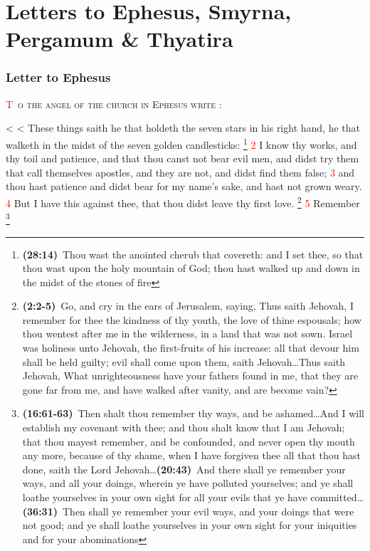 \documentclass[12pt,twoside]{memoir}
\makeatletter
\newcommand{\cbibleref}[3]{\textbf{\ibibleverse[textit]{#1}(#2)}\ {#3}}
\newcommand{\cbiblechvs}[3]{\textbf{\ibiblechvs[textit]{#1}(#2)}\ {#3}}
\newcommand{\cbiblefoot}[3]{\footnote{\cbibleref{#1}{#2}{#3}}}
\newcommand{\cbiblefoottriosb}[7]{\footnote{\cbibleref{#1}{#2}{#3}\ldots \cbiblechvs{#1}{#4}{#5}\ldots \cbiblechvs{#1}{#6}{#7}}}
\newcommand{\vnum}[1]{\textcolor{red}{\normalsize{#1}}}
\def\zz{%
\ifnum\prevgraf<\c@L@lines
\zzc\z@
\loop
\ifnum\zzc<\prevgraf
\advance\zzc\@ne
\afterassignment\zzda\count@\L@parshape\relax
\repeat
\parshape\L@parshape
\fi}
\def\zzda{\afterassignment\zzdb\dimen@}
\def\zzdb{\afterassignment\zzdef\dimen@}
\def\zzdef#1\relax{\edef\L@parshape{\the\numexpr\count@-1\relax\space #1}}
\makeatother
\begin{document}
\chapter{Letters to Ephesus, Smyrna, \newline Pergamum \& Thyatira}
\subsection*{Letter to Ephesus}
\lettrine[lines=3]{\textcolor{red}{T}}{\ o the angel of the church in Ephesus write} :

\zz These things saith he that holdeth the seven stars in his right hand, he that walketh in the midst of the seven golden candlesticks:%
	\cbiblefoot{Ezekiel}{28:14}{Thou wast the anointed cherub that covereth: and I set thee, so that thou wast upon the holy mountain of God; thou hast walked up and down in the midst of the stones of fire}
\vnum{2} I know thy works, and thy toil and patience, and that thou canst not bear evil men, and didst try them that call themselves apostles, and they are not, and didst find them false; %
\vnum{3} and thou hast patience and didst bear for my name’s sake, and hast not grown weary. %
\vnum{4} But I have this against thee, that thou didst leave thy first love.%
	\cbiblefoot{Jeremiah}{2:2-5}{Go, and cry in the ears of Jerusalem, saying, Thus saith Jehovah, I remember for thee the kindness of thy youth, the love of thine espousals; how thou wentest after me in the wilderness, in a land that was not sown. Israel was holiness unto Jehovah, the first-fruits of his increase: all that devour him shall be held guilty; evil shall come upon them, saith Jehovah\ldots Thus saith Jehovah, What unrighteousness have your fathers found in me, that they are gone far from me, and have walked after vanity, and are become vain?}
\vnum{5} Remember%
	\cbiblefoottriosb{Ezekiel}{16:61-63}{Then shalt thou remember thy ways, and be ashamed\ldots And I will establish my covenant with thee; and thou shalt know that I am Jehovah; that thou mayest remember, and be confounded, and never open thy mouth any more, because of thy shame, when I have forgiven thee all that thou hast done, saith the Lord Jehovah}%
				{20:43}{And there shall ye remember your ways, and all your doings, wherein ye have polluted yourselves; and ye shall loathe yourselves in your own sight for all your evils that ye have committed}%
				{36:31}{Then shall ye remember your evil ways, and your doings that were not good; and ye shall loathe yourselves in your own sight for your iniquities and for your abominations}%
\end{document}
